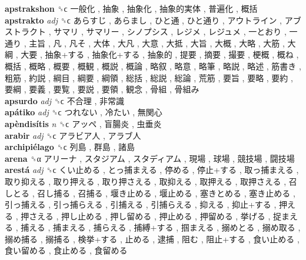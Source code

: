 \textbf{apstrakshon} ␝ϲ   一般化 ,  抽象 ,  抽象化 ,  抽象的実体 ,  普遍化 ,  概括   \\
\textbf{apstrakto} \emph{adj}  ␝ϲ   あらすじ ,  あらまし ,  ひと通 ,  ひと通り ,  アウトライン ,  アブストラクト ,  サマリ ,  サマリー ,  シノプシス ,  レジメ ,  レジュメ ,  一とおり ,  一通り ,  主旨 ,  凡 ,  凡そ ,  大体 ,  大凡 ,  大意 ,  大抵 ,  大旨 ,  大概 ,  大略 ,  大筋 ,  大綱 ,  大要 ,  抽象+する ,  抽象化+する ,  抽象的 ,  提要 ,  摘要 ,  撮要 ,  梗概 ,  概ね ,  概括 ,  概略 ,  概要 ,  概観 ,  概説 ,  概論 ,  略叙 ,  略意 ,  略筆 ,  略説 ,  略述 ,  筋書き ,  粗筋 ,  約説 ,  綱目 ,  綱要 ,  綱領 ,  総括 ,  総説 ,  総論 ,  荒筋 ,  要旨 ,  要略 ,  要約 ,  要綱 ,  要義 ,  要覧 ,  要説 ,  要領 ,  観念 ,  骨組 ,  骨組み   \\
\textbf{apsurdo} \emph{adj}  ␝ϲ   不合理 ,  非常識   \\
\textbf{apátiko} \emph{adj}  ␝ϲ   つれない ,  冷たい ,  無関心   \\
\textbf{apèndisítis} \emph{n}  ␝ϲ   アッペ ,  盲腸炎 ,  虫垂炎   \\
\textbf{arabir} \emph{adj}  ␝ϲ   アラビア人 ,  アラブ人   \\
\textbf{archipiélago} ␝ϲ   列島 ,  群島 ,  諸島   \\
\textbf{arena} ␝α   アリーナ ,  スタジアム ,  スタディアム ,  現場 ,  球場 ,  競技場 ,  闘技場   \\
\textbf{arestá} \emph{adj}  ␝ϲ   くい止める ,  とっ捕まえる ,  停める ,  停止+する ,  取っ捕まえる ,  取り抑える ,  取り押える ,  取り押さえる ,  取抑える ,  取押える ,  取押さえる ,  召しとる ,  召し捕る ,  召捕る ,  堰き止める ,  堰止める ,  塞きとめる ,  塞き止める ,  引っ捕える ,  引っ捕らえる ,  引捕える ,  引捕らえる ,  抑える ,  抑止+する ,  押える ,  押さえる ,  押し止める ,  押し留める ,  押止める ,  押留める ,  挙げる ,  捉まえる ,  捕える ,  捕まえる ,  捕らえる ,  捕縛+する ,  掴まえる ,  搦めとる ,  搦め取る ,  搦め捕る ,  搦捕る ,  検挙+する ,  止める ,  逮捕 ,  阻む ,  阻止+する ,  食い止める ,  食い留める ,  食止める ,  食留める   \\
